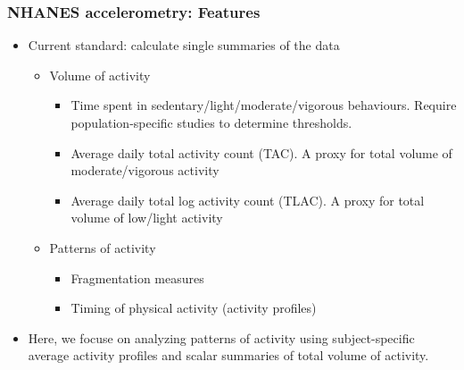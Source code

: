 \documentclass[10pt]{beamer}\usepackage[]{graphicx}\usepackage[]{color}
\begin{document}
\begin{frame}
\frametitle{NHANES accelerometry: Features}
\begin{itemize}
\item Current standard: calculate single summaries of the data
    \begin{itemize}
    \item Volume of activity\footnotemark
        \begin{itemize}
        \item Time spent in sedentary/light/moderate/vigorous behaviours. Require population-specific studies to determine thresholds.
        \item Average daily total activity count (TAC). A proxy for total volume of moderate/vigorous activity
        \item Average daily total log activity count (TLAC). A proxy for total volume of low/light activity
        \end{itemize}
    \item Patterns of activity
        \begin{itemize}
        \item Fragmentation measures\footnotemark
        \item Timing of physical activity (activity profiles)
        \end{itemize}
    \end{itemize}
\item Here, we focuse on analyzing patterns of activity using subject-specific average activity profiles and scalar summaries of total volume of activity. 
\end{itemize}


\end{frame}
\end{document}
